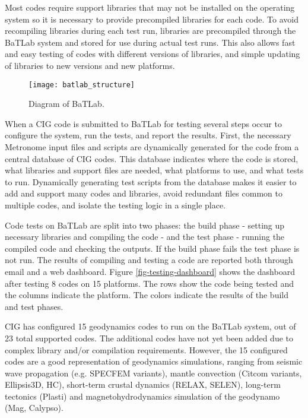 \documentclass{acm_proc_article-sp}
\begin{document}
Most codes require support libraries that may not be installed on the operating system so it is necessary to provide precompiled libraries for each code.  To avoid recompiling libraries during each test run, libraries are precompiled through the BaTLab system and stored for use during actual test runs.  This also allows fast and easy testing of codes with different versions of libraries, and simple updating of libraries to new versions and new platforms.

\begin{figure}
\centering
\texttt{[image: batlab\_structure]}
\caption{Diagram of BaTLab.}
\label{fig-batlab-diagram}
\end{figure}

When a CIG code is submitted to BaTLab for testing several steps occur to configure the system, run the tests, and report the results.  First, the necessary Metronome input files and scripts are dynamically generated for the code from a central database of CIG codes.  This database indicates where the code is stored, what libraries and support files are needed, what platforms to use, and what tests to run.  Dynamically generating test scripts from the database makes it easier to add and support many codes and libraries, avoid redundant files common to multiple codes, and isolate the testing logic in a single place.

Code tests on BaTLab are split into two phases: the build phase - setting up necessary libraries and compiling the code - and the test phase - running the compiled code and checking the outputs.  If the build phase fails the test phase is not run. The results of compiling and testing a code are reported both through email and a web dashboard.  Figure \ref{fig-testing-dashboard} shows the dashboard after testing 8 codes on 15 platforms.  The rows show the code being tested and the columns indicate the platform.  The colors indicate the results of the build and test phases.

CIG has configured 15 geodynamics codes to run on the BaTLab system, out of 23 total supported codes.  The additional codes have not yet been added due to complex library and/or compilation requirements.  However, the 15 configured codes are a good representation of geodynamics simulations, ranging from seismic wave propagation (e.g. SPECFEM variants), mantle convection (Citcom variants, Ellipsis3D, HC), short-term crustal dynamics (RELAX, SELEN), long-term tectonics (Plasti) and magnetohydrodynamics simulation of the geodynamo (Mag, Calypso).  
\end{document}
